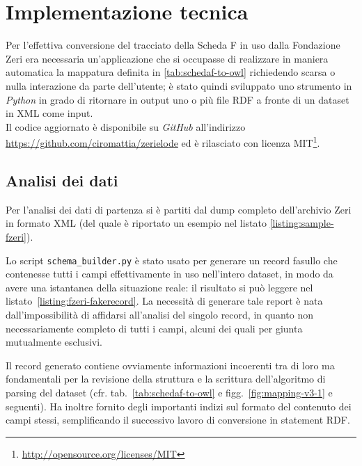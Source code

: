 \chapter{Implementazione tecnica}\label{chap:implementation}

Per l'effettiva conversione del tracciato della Scheda F in uso dalla Fondazione Zeri era necessaria un'applicazione che si occupasse di realizzare in maniera automatica la mappatura definita in \ref{tab:schedaf-to-owl} richiedendo scarsa o nulla interazione da parte dell'utente; è stato quindi sviluppato uno strumento in \emph{Python} in grado di ritornare in output uno o più file RDF a fronte di un dataset in XML come input.\\

Il codice aggiornato è disponibile su \emph{GitHub} all'indirizzo \url{https://github.com/ciromattia/zerielode} ed è rilasciato con licenza MIT\footnote{\url{http://opensource.org/licenses/MIT}}.

\section{Analisi dei dati}\label{sec:data-analysis}

Per l'analisi dei dati di partenza si è partiti dal dump completo dell'archivio Zeri in formato XML (del quale è riportato un esempio nel listato \ref{listing:sample-fzeri}).



\label{sec:fakerecord}Lo script \texttt{schema\_builder.py} è stato usato per generare un record fasullo che contenesse tutti i campi effettivamente in uso nell'intero dataset, in modo da avere una istantanea della situazione reale: il risultato si può leggere nel listato~\ref{listing:fzeri-fakerecord}. La necessità di generare tale report è nata dall'impossibilità di affidarsi all'analisi del singolo record, in quanto non necessariamente completo di tutti i campi, alcuni dei quali per giunta mutualmente esclusivi.

Il record generato contiene ovviamente informazioni incoerenti tra di loro ma fondamentali per la revisione della struttura e la scrittura dell'algoritmo di parsing del dataset (cfr. tab.~\ref{tab:schedaf-to-owl} e figg.~\ref{fig:mapping-v3-1} e seguenti). Ha inoltre fornito degli importanti indizi sul formato del contenuto dei campi stessi, semplificando il successivo lavoro di conversione in statement RDF.

